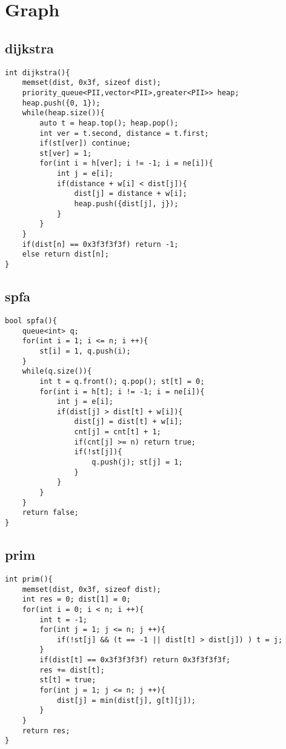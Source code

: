 \documentclass[twocolumn,a4]{article}
\begin{document}
\section{Graph}

\subsection{dijkstra}
\begin{lstlisting}
int dijkstra(){
    memset(dist, 0x3f, sizeof dist);
    priority_queue<PII,vector<PII>,greater<PII>> heap;
    heap.push({0, 1});
    while(heap.size()){
        auto t = heap.top(); heap.pop();
        int ver = t.second, distance = t.first;
        if(st[ver]) continue;
        st[ver] = 1;
        for(int i = h[ver]; i != -1; i = ne[i]){
            int j = e[i];
            if(distance + w[i] < dist[j]){
                dist[j] = distance + w[i];
                heap.push({dist[j], j});
            }
        }
    }
    if(dist[n] == 0x3f3f3f3f) return -1;
    else return dist[n];
}

\end{lstlisting}
\subsection{spfa}
\begin{lstlisting}
bool spfa(){
    queue<int> q;
    for(int i = 1; i <= n; i ++){
        st[i] = 1, q.push(i);
    }        
    while(q.size()){
        int t = q.front(); q.pop(); st[t] = 0;
        for(int i = h[t]; i != -1; i = ne[i]){
            int j = e[i];
            if(dist[j] > dist[t] + w[i]){
                dist[j] = dist[t] + w[i];
                cnt[j] = cnt[t] + 1;
                if(cnt[j] >= n) return true;
                if(!st[j]){
                    q.push(j); st[j] = 1;
                }
            }
        }
    }
    return false;
}
\end{lstlisting}
\subsection{prim}

\begin{lstlisting}
int prim(){
    memset(dist, 0x3f, sizeof dist);    
    int res = 0; dist[1] = 0;
    for(int i = 0; i < n; i ++){
        int t = -1;
        for(int j = 1; j <= n; j ++){
            if(!st[j] && (t == -1 || dist[t] > dist[j]) ) t = j;
        }
        if(dist[t] == 0x3f3f3f3f) return 0x3f3f3f3f;
        res += dist[t];
        st[t] = true;
        for(int j = 1; j <= n; j ++){
            dist[j] = min(dist[j], g[t][j]);
        }
    }
    return res;
}
\end{lstlisting}
\end{document}
